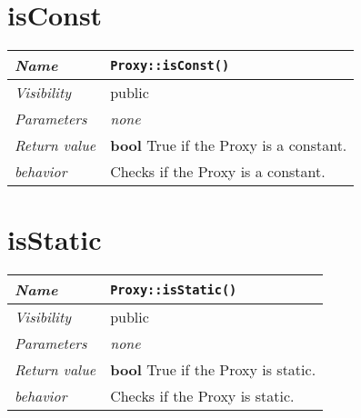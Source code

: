  \section{isConst}
\begin{longtable}{p{3cm} @{\hskip 1cm} p{12cm}}
 \hline
\textit{Name} & \texttt{Proxy::isConst()}\\
\hline
 \textit{Visibility} & public\\
\hline
\textit{Parameters} & \textit{none}\\
\hline
\textit{Return value} & \textbf{ bool} True if the Proxy is a constant. \\
  \hline
 \textit{behavior} & Checks if the Proxy is a constant. \\
\hline
\end{longtable} \pagebreak
 \section{isStatic}
\begin{longtable}{p{3cm} @{\hskip 1cm} p{12cm}}
 \hline
\textit{Name} & \texttt{Proxy::isStatic()}\\
\hline
 \textit{Visibility} & public\\
\hline
\textit{Parameters} & \textit{none}\\
\hline
\textit{Return value} & \textbf{ bool} True if the Proxy is static. \\
  \hline
 \textit{behavior} & Checks if the Proxy is static. \\
\hline
\end{longtable} \pagebreak
 